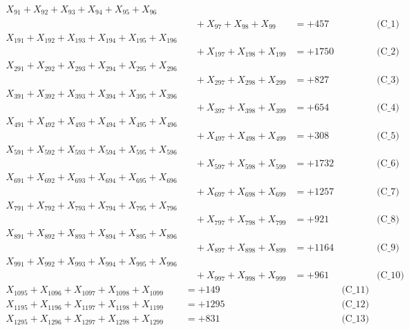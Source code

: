 \documentclass[a4paper,10pt]{article}
\begin{document}
\allowdisplaybreaks
{\small
\begin{align}
X_{91} + X_{92} + X_{93} + X_{94} + X_{95} + X_{96} \\[0.1ex]
&\quad  + X_{97} + X_{98} + X_{99} &= +457 && \text{(C\_1)} \\
X_{191} + X_{192} + X_{193} + X_{194} + X_{195} + X_{196} \\[0.1ex]
&\quad  + X_{197} + X_{198} + X_{199} &= +1750 && \text{(C\_2)} \\
X_{291} + X_{292} + X_{293} + X_{294} + X_{295} + X_{296} \\[0.1ex]
&\quad  + X_{297} + X_{298} + X_{299} &= +827 && \text{(C\_3)} \\
X_{391} + X_{392} + X_{393} + X_{394} + X_{395} + X_{396} \\[0.1ex]
&\quad  + X_{397} + X_{398} + X_{399} &= +654 && \text{(C\_4)} \\
X_{491} + X_{492} + X_{493} + X_{494} + X_{495} + X_{496} \\[0.1ex]
&\quad  + X_{497} + X_{498} + X_{499} &= +308 && \text{(C\_5)} \\
\allowbreak
X_{591} + X_{592} + X_{593} + X_{594} + X_{595} + X_{596} \\[0.1ex]
&\quad  + X_{597} + X_{598} + X_{599} &= +1732 && \text{(C\_6)} \\
X_{691} + X_{692} + X_{693} + X_{694} + X_{695} + X_{696} \\[0.1ex]
&\quad  + X_{697} + X_{698} + X_{699} &= +1257 && \text{(C\_7)} \\
X_{791} + X_{792} + X_{793} + X_{794} + X_{795} + X_{796} \\[0.1ex]
&\quad  + X_{797} + X_{798} + X_{799} &= +921 && \text{(C\_8)} \\
X_{891} + X_{892} + X_{893} + X_{894} + X_{895} + X_{896} \\[0.1ex]
&\quad  + X_{897} + X_{898} + X_{899} &= +1164 && \text{(C\_9)} \\
X_{991} + X_{992} + X_{993} + X_{994} + X_{995} + X_{996} \\[0.1ex]
&\quad  + X_{997} + X_{998} + X_{999} &= +961 && \text{(C\_10)} \\
\allowbreak
X_{1095} + X_{1096} + X_{1097} + X_{1098} + X_{1099} &= +149 && \text{(C\_11)} \\
X_{1195} + X_{1196} + X_{1197} + X_{1198} + X_{1199} &= +1295 && \text{(C\_12)} \\
X_{1295} + X_{1296} + X_{1297} + X_{1298} + X_{1299} &= +831 && \text{(C\_13)} \\

\end{align}}
\end{document}

